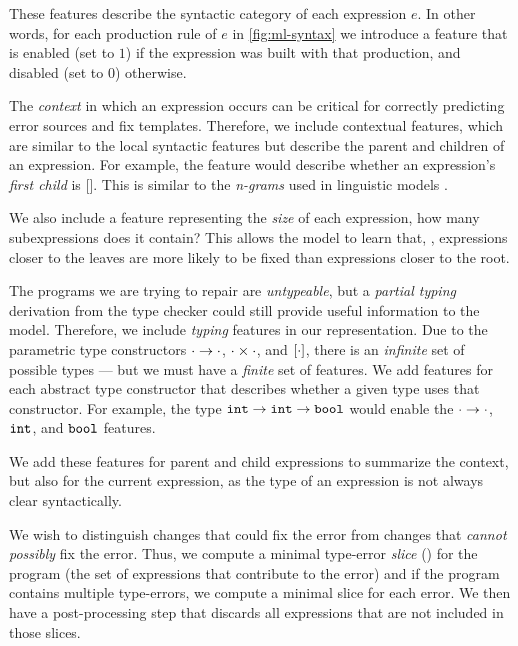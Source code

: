 These features describe the syntactic category of each expression $e$. In other
words, for each production rule of $e$ in \autoref{fig:ml-syntax} we introduce a
feature that is enabled (set to $1$) if the expression was built with that
production, and disabled (set to $0$) otherwise.

The \emph{context} in which an expression occurs can be critical for correctly
predicting error sources and fix templates. Therefore, we include contextual
features, which are similar to the local syntactic features but describe the
parent and children of an expression. For example, the \IsNilC feature
would describe whether an expression's \emph{first child} is []. This
is similar
to the \emph{n-grams} used in linguistic models
\citep{Hindle2012-hf,Gabel2010-el}.

We also include a feature representing the \emph{size} of each expression, \ie
how many subexpressions does it contain? This allows the model to learn that,
\eg, expressions closer to the leaves are more likely to be fixed than
expressions closer to the root.

The programs we are trying to repair are \emph{untypeable}, but a \emph{partial
typing} derivation from the type checker could still provide useful information
to the model. Therefore, we include \emph{typing} features in our
representation. Due to the parametric type constructors
$\cdot \to \cdot$, $\cdot \times \cdot$, and $[\cdot]$, there is an
\emph{infinite} set of possible types --- but we must have a \emph{finite} set
of features. We add features for each abstract type constructor that describes whether a
given type uses that constructor. For example, the type
$\mathtt{int} \to \mathtt{int} \to \mathtt{bool}$
would enable the $\cdot \to \cdot$, $\mathtt{int}$, and $\mathtt{bool}$ features.

We add these features for parent and child expressions to summarize the context,
but also for the current expression, as the type of an expression is not always
clear syntactically.

We wish to distinguish changes that could fix the error from changes that
\emph{cannot possibly} fix the error. Thus, we compute a minimal type-error
\emph{slice} (\eg \citep{Tip2001-qp,Haack2003-vc}) for the program (\ie the set
of expressions that contribute to the error) and if the program contains
multiple type-errors, we compute a minimal slice for each error. We then have a
post-processing step that discards all expressions that are not included in
those slices.

